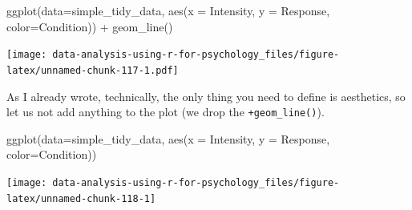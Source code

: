 \documentclass[
]{book}
\newenvironment{Shaded}{\begin{snugshade}}{\end{snugshade}}
\newcommand{\AttributeTok}[1]{\textcolor[rgb]{0.77,0.63,0.00}{#1}}
\newcommand{\FunctionTok}[1]{\textcolor[rgb]{0.00,0.00,0.00}{#1}}
\newcommand{\NormalTok}[1]{#1}
\newcommand{\SpecialCharTok}[1]{\textcolor[rgb]{0.00,0.00,0.00}{#1}}
\begin{document}
\begin{Shaded}
\begin{Highlighting}[]
\FunctionTok{ggplot}\NormalTok{(}\AttributeTok{data=}\NormalTok{simple\_tidy\_data, }\FunctionTok{aes}\NormalTok{(}\AttributeTok{x =}\NormalTok{ Intensity, }\AttributeTok{y =}\NormalTok{ Response, }\AttributeTok{color=}\NormalTok{Condition)) }\SpecialCharTok{+} 
  \FunctionTok{geom\_line}\NormalTok{()}
\end{Highlighting}
\end{Shaded}

\texttt{[image: data-analysis-using-r-for-psychology\_files/figure-latex/unnamed-chunk-117-1.pdf]}

As I already wrote, technically, the only thing you need to define is aesthetics, so let us not add anything to the plot (we drop the \texttt{+geom\_line()}).

\begin{Shaded}
\begin{Highlighting}[]
\FunctionTok{ggplot}\NormalTok{(}\AttributeTok{data=}\NormalTok{simple\_tidy\_data, }\FunctionTok{aes}\NormalTok{(}\AttributeTok{x =}\NormalTok{ Intensity, }\AttributeTok{y =}\NormalTok{ Response, }\AttributeTok{color=}\NormalTok{Condition))}
\end{Highlighting}
\end{Shaded}

\begin{center}\texttt{[image: data-analysis-using-r-for-psychology\_files/figure-latex/unnamed-chunk-118-1]} \end{center}
\end{document}
